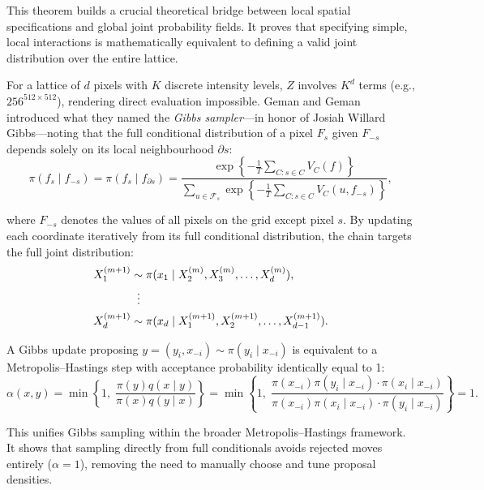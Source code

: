 \noindent This theorem builds a crucial theoretical bridge between local spatial specifications and global joint probability fields. It proves that specifying simple, local interactions is mathematically equivalent to defining a valid joint distribution over the entire lattice.

For a lattice of $d$ pixels with $K$ discrete intensity levels, $Z$ involves $K^d$ terms (e.g., $256^{512 \times 512}$), rendering direct evaluation impossible. Geman and Geman introduced what they named the \emph{Gibbs sampler}—in honor of Josiah Willard Gibbs—noting that the full conditional distribution of a pixel $F_s$ given $F_{-s}$ depends solely on its local neighbourhood $\partial s$:
\begin{equation}
    \pi(f_s \mid f_{-s}) = \pi(f_s \mid f_{\partial s}) = \frac{\exp\left\{ -\frac{1}{T} \sum_{C : s \in C} V_C(f) \right\}}{\sum_{u \in \mathcal{F}_s} \exp\left\{ -\frac{1}{T} \sum_{C : s \in C} V_C(u, f_{-s}) \right\}},
\end{equation}


where $F_{-s}$ denotes the values of all pixels on the grid except pixel $s$. By updating each coordinate iteratively from its full conditional distribution, the chain targets the full joint distribution:
\begin{align}
    X_1^{(m+1)} &\sim \pi(x_1 \mid X_2^{(m)}, X_3^{(m)}, \dots, X_d^{(m)}), \\
    &\;\;\vdots \notag \\
    X_d^{(m+1)} &\sim \pi(x_d \mid X_1^{(m+1)}, X_2^{(m+1)}, \dots, X_{d-1}^{(m+1)}).
\end{align}


\begin{proposition}
\label{prop:gibbs-as-mh}
A Gibbs update proposing $y = (y_i, x_{-i}) \sim \pi(y_i \mid x_{-i})$ is equivalent to a Metropolis--Hastings step with acceptance probability identically equal to 1:
\begin{equation}
    \alpha(x,y) = \min\left\{1, \; \frac{\pi(y) q(x \mid y)}{\pi(x) q(y \mid x)}\right\} = \min\left\{1, \; \frac{\pi(x_{-i})\pi(y_i \mid x_{-i}) \cdot \pi(x_i \mid x_{-i})}{\pi(x_{-i})\pi(x_i \mid x_{-i}) \cdot \pi(y_i \mid x_{-i})}\right\} = 1.
\end{equation}
\end{proposition}
\noindent This unifies Gibbs sampling within the broader Metropolis--Hastings framework. It shows that sampling directly from full conditionals avoids rejected moves entirely ($\alpha = 1$), removing the need to manually choose and tune proposal densities.

